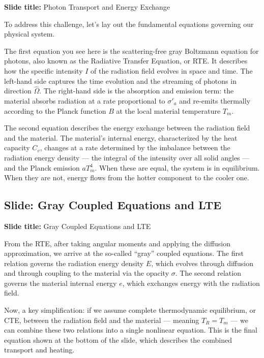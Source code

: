 \documentclass[12pt, a4paper]{article}
\begin{document}
\begin{slidebox}
\textbf{Slide title:} Photon Transport and Energy Exchange
\end{slidebox}

To address this challenge, let's lay out the fundamental equations governing our physical system.

The first equation you see here is the scattering-free gray Boltzmann equation for photons, also known as the Radiative Transfer Equation, or RTE. It describes how the specific intensity $I$ of the radiation field evolves in space and time. The left-hand side captures the time evolution and the streaming of photons in direction $\hat{\Omega}$. The right-hand side is the absorption and emission term: the material absorbs radiation at a rate proportional to $\sigma'_a$ and re-emits thermally according to the Planck function $B$ at the local material temperature $T_m$.

The second equation describes the energy exchange between the radiation field and the material. The material's internal energy, characterized by the heat capacity $C_v$, changes at a rate determined by the imbalance between the radiation energy density --- the integral of the intensity over all solid angles --- and the Planck emission $aT_m^4$. When these are equal, the system is in equilibrium. When they are not, energy flows from the hotter component to the cooler one.

\subsection{Slide: Gray Coupled Equations and LTE}

\begin{slidebox}
\textbf{Slide title:} Gray Coupled Equations and LTE
\end{slidebox}

From the RTE, after taking angular moments and applying the diffusion approximation, we arrive at the so-called ``gray'' coupled equations. The first relation governs the radiation energy density $E$, which evolves through diffusion and through coupling to the material via the opacity $\sigma$. The second relation governs the material internal energy $e$, which exchanges energy with the radiation field.

Now, a key simplification: if we assume complete thermodynamic equilibrium, or CTE, between the radiation field and the material --- meaning $T_R = T_m$ --- we can combine these two relations into a single nonlinear equation. This is the final equation shown at the bottom of the slide, which describes the combined transport and heating.
\end{document}
